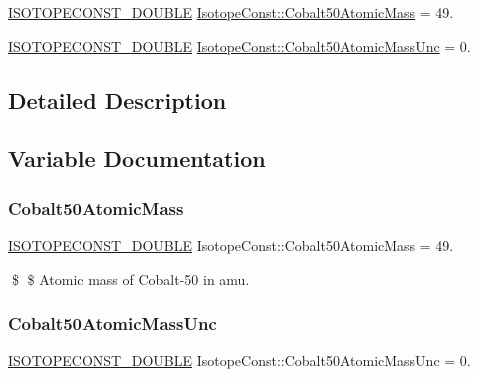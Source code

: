 \begin{DoxyCompactItemize}
\item 
\mbox{\hyperlink{group___isotope_const-_macros_ga8f45a7272ce02c0b4c65c44636ed719a}{I\+S\+O\+T\+O\+P\+E\+C\+O\+N\+S\+T\+\_\+\+D\+O\+U\+B\+LE}} \mbox{\hyperlink{group___isotope_const-_cobalt-_co50_gaa8cf687b799284f6584a258d0337b1e3}{Isotope\+Const\+::\+Cobalt50\+Atomic\+Mass}} = 49.
\item 
\mbox{\hyperlink{group___isotope_const-_macros_ga8f45a7272ce02c0b4c65c44636ed719a}{I\+S\+O\+T\+O\+P\+E\+C\+O\+N\+S\+T\+\_\+\+D\+O\+U\+B\+LE}} \mbox{\hyperlink{group___isotope_const-_cobalt-_co50_ga9f8bd775e1a9760dbee103e078a01ad9}{Isotope\+Const\+::\+Cobalt50\+Atomic\+Mass\+Unc}} = 0.
\end{DoxyCompactItemize}


\subsection{Detailed Description}


\subsection{Variable Documentation}
\mbox{\label{group___isotope_const-_cobalt-_co50_gaa8cf687b799284f6584a258d0337b1e3}} 
\subsubsection{\texorpdfstring{Cobalt50\+Atomic\+Mass}{Cobalt50AtomicMass}}
{\footnotesize\ttfamily \mbox{\hyperlink{group___isotope_const-_macros_ga8f45a7272ce02c0b4c65c44636ed719a}{I\+S\+O\+T\+O\+P\+E\+C\+O\+N\+S\+T\+\_\+\+D\+O\+U\+B\+LE}} Isotope\+Const\+::\+Cobalt50\+Atomic\+Mass = 49.}

\$ \$ Atomic mass of Cobalt-\/50 in amu. \mbox{\label{group___isotope_const-_cobalt-_co50_ga9f8bd775e1a9760dbee103e078a01ad9}} 
\subsubsection{\texorpdfstring{Cobalt50\+Atomic\+Mass\+Unc}{Cobalt50AtomicMassUnc}}
{\footnotesize\ttfamily \mbox{\hyperlink{group___isotope_const-_macros_ga8f45a7272ce02c0b4c65c44636ed719a}{I\+S\+O\+T\+O\+P\+E\+C\+O\+N\+S\+T\+\_\+\+D\+O\+U\+B\+LE}} Isotope\+Const\+::\+Cobalt50\+Atomic\+Mass\+Unc = 0.}

